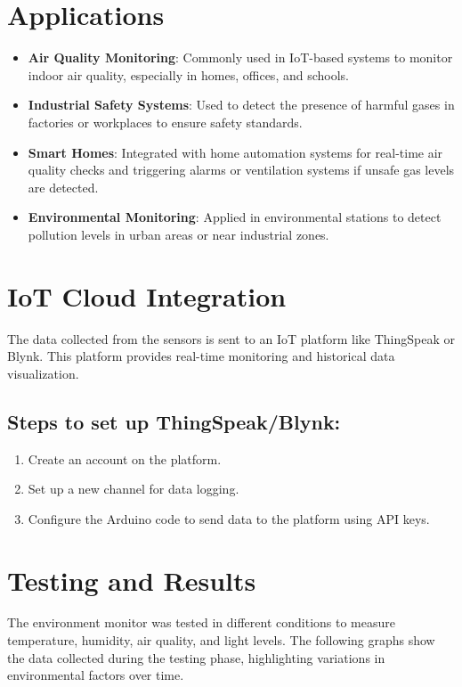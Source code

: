 \documentclass[12pt]{report}
\begin{document}
	
	\section*{Applications}
	
	\begin{itemize}
		\item \textbf{Air Quality Monitoring}: Commonly used in IoT-based systems to monitor indoor air quality, especially in homes, offices, and schools.
		\item \textbf{Industrial Safety Systems}: Used to detect the presence of harmful gases in factories or workplaces to ensure safety standards.
		\item \textbf{Smart Homes}: Integrated with home automation systems for real-time air quality checks and triggering alarms or ventilation systems if unsafe gas levels are detected.
		\item \textbf{Environmental Monitoring}: Applied in environmental stations to detect pollution levels in urban areas or near industrial zones.
	\end{itemize}
	\clearpage
	
	
	\section*{IoT Cloud Integration}
	The data collected from the sensors is sent to an IoT platform like ThingSpeak or Blynk. This platform provides real-time monitoring and historical data visualization.
	
	\subsection*{Steps to set up ThingSpeak/Blynk:}
	\begin{enumerate}
		\item Create an account on the platform.
		\item Set up a new channel for data logging.
		\item Configure the Arduino code to send data to the platform using API keys.
	\end{enumerate}
	
	\section*{Testing and Results}
	The environment monitor was tested in different conditions to measure temperature, humidity, air quality, and light levels. The following graphs show the data collected during the testing phase, highlighting variations in environmental factors over time.
	
\end{document}

